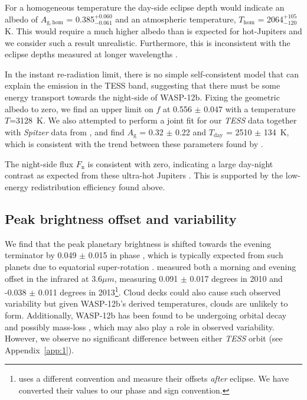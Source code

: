 \documentclass[fleqn,usenatbib]{mnras}
\begin{document}
For a homogeneous temperature the day-side eclipse depth would indicate an albedo of $A_{\mathrm{g, hom}}$ = 0.385$^{+0.060}_{-0.061}$ and an atmospheric temperature, $T_{\mathrm{hom}}$ =  2064$^{+105}_{-120}$K. This would require a much higher albedo than is expected for hot-Jupiters and we consider such a result unrealistic. Furthermore, this is inconsistent with the eclipse depths measured at longer wavelengths \citep[e.g.][]{croll}. 

In the instant re-radiation limit, there is no simple self-consistent model that can explain the emission in the TESS band, suggesting that there must be some energy transport towards the night-side of WASP-12b. Fixing the geometric albedo to zero, we find an upper limit on $f$ at 0.556 $\pm$ 0.047 with a temperature $T$=3128~K. We also attempted to perform a joint fit for our \textit{TESS} data together with \textit{Spitzer} data from \cite{bell2}, and find $A_{\mathrm{g}}$ = 0.32 $\pm$ 0.22 and $T_{\mathrm{day}}$ = 2510 $\pm$ 134~K, which is consistent with the trend between these parameters found by \cite{wongetal}.

The night-side flux $F_{\mathrm{n}}$ is consistent with zero, indicating a large day-night contrast as expected from these ultra-hot Jupiters \citep[e.g.][]{contrast1, contrast3}. This is supported by the low-energy redistribution efficiency found above.

\subsection{Peak brightness offset and variability}
We find that the peak planetary brightness is shifted towards the evening terminator by 0.049 $\pm$ 0.015 in phase , which is typically expected from such planets due to equatorial super-rotation \citep{superrotation}. \citet{bell2} measured both a morning and evening offset in the infrared at 3.6$\mu m$, measuring 0.091 $\pm$ 0.017 degrees in 2010 and -0.038 $\pm$ 0.011 degrees in 2013\footnote{\citet{bell2} uses a different convention and
measure their offsets \textit{after} eclipse. We have converted their values to our phase and sign convention.}. Cloud decks could also cause such observed variability but given WASP-12b's derived temperatures, clouds are unlikely to form. Additionally, WASP-12b has been found to be undergoing orbital decay \citep{orbitdecay} and possibly mass-loss \citep{bell2}, which may also play a role in observed variability. However, we observe no significant difference between either \textit{TESS} orbit (see Appendix~\ref{app:1}).
\end{document}
